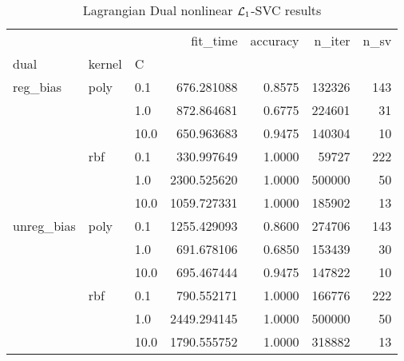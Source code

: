 \begin{table}[H]
\centering
\caption{Lagrangian Dual nonlinear $\protect \mathcal{L}_1$-SVC results}
\label{nonlinear_lagrangian_dual_l1_svc_cv_results}
\begin{tabular}{lllrrrr}
\toprule
           &     &      &     fit\_time &  accuracy &  n\_iter &  n\_sv \\
dual & kernel & C &              &           &         &       \\
\midrule
reg\_bias & poly & 0.1  &   676.281088 &    0.8575 &  132326 &   143 \\
           &     & 1.0  &   872.864681 &    0.6775 &  224601 &    31 \\
           &     & 10.0 &   650.963683 &    0.9475 &  140304 &    10 \\
           & rbf & 0.1  &   330.997649 &    1.0000 &   59727 &   222 \\
           &     & 1.0  &  2300.525620 &    1.0000 &  500000 &    50 \\
           &     & 10.0 &  1059.727331 &    1.0000 &  185902 &    13 \\
unreg\_bias & poly & 0.1  &  1255.429093 &    0.8600 &  274706 &   143 \\
           &     & 1.0  &   691.678106 &    0.6850 &  153439 &    30 \\
           &     & 10.0 &   695.467444 &    0.9475 &  147822 &    10 \\
           & rbf & 0.1  &   790.552171 &    1.0000 &  166776 &   222 \\
           &     & 1.0  &  2449.294145 &    1.0000 &  500000 &    50 \\
           &     & 10.0 &  1790.555752 &    1.0000 &  318882 &    13 \\
\bottomrule
\end{tabular}
\end{table}
